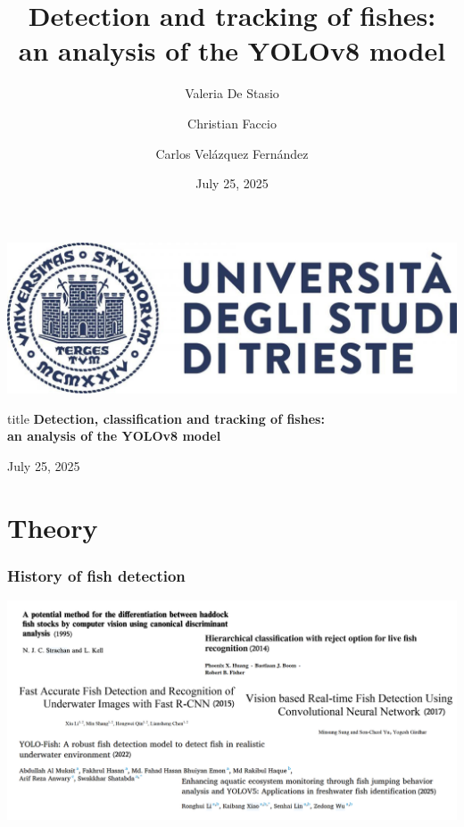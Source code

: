 \documentclass[serif]{beamer}  %
\author{
    Valeria De Stasio \\ 
    \and  
    Christian Faccio \\
    \and  
    Carlos Velázquez Fernández
}
\title{Detection and tracking of fishes: \\ an analysis of the YOLOv8 model}
\date{\small July 25, 2025}
\begin{document}
\begin{frame}
    \vfill
    \begin{center}
        \includegraphics[keepaspectratio, scale=0.15]{images/logo.jpg}
        
        \vspace{1cm}
        
        \begin{beamercolorbox}[wd=\textwidth,center,rounded=true]{title}
            {\textbf{Detection, classification and tracking of fishes: \\ an analysis of the YOLOv8 model}}
        \end{beamercolorbox}
        
        \vspace{1cm}
        
        {July 25, 2025}
    \end{center}
    \vfill
\end{frame}

\begin{frame}    
\tableofcontents[sectionstyle=show,
subsectionstyle=show/shaded/hide,
subsubsectionstyle=show/shaded/hide]
\end{frame}

\section{Theory}

\begin{frame}
\frametitle{History of fish detection}
\centering
\includegraphics[width=1\linewidth]{images/Fish detection papers with years.jpg}
\end{frame}
\end{document}
